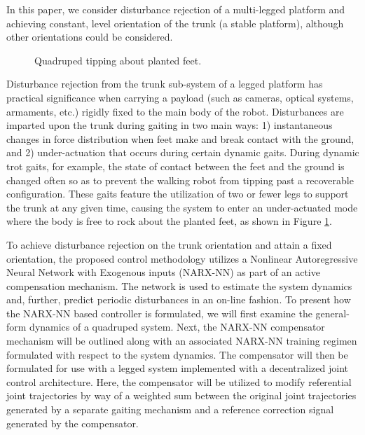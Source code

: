 In this paper, we consider disturbance rejection of a multi-legged platform and achieving constant, level orientation of the trunk (\IE a stable platform), although other orientations could be considered. 
	\begin{figure}[t!]
		\vspace{2mm}
		\centering
		\caption{ Quadruped tipping about planted feet.}
		\label{fig::quadruped_walking}
		\vspace{-7mm}
	\end{figure}
Disturbance rejection from the trunk sub-system of a legged platform has practical significance when carrying a payload (such as cameras, optical systems, armaments, etc.) rigidly fixed to the main body of the robot. Disturbances are imparted upon the trunk during gaiting in two main ways: 1) instantaneous changes in force distribution when feet make and break contact with the ground, and 2) under-actuation that occurs during certain dynamic gaits. During dynamic trot gaits, for example, the state of contact between the feet and the ground is changed often so as to prevent the walking robot from tipping past a recoverable configuration. These gaits feature the utilization of two or fewer legs to support the trunk at any given time, causing the system to enter an under-actuated mode where the body is free to rock about the planted feet, as shown in Figure \ref{fig::quadruped_walking}.

To achieve disturbance rejection on the trunk orientation and attain a fixed orientation, the proposed control methodology utilizes a Nonlinear Autoregressive Neural Network with Exogenous inputs (NARX-NN) as part of an active compensation mechanism. The network is used to estimate the system dynamics and, further, predict periodic disturbances in an on-line fashion. To present how the NARX-NN based controller is formulated, we will first examine the general-form dynamics of a quadruped system. Next, the NARX-NN compensator mechanism will be outlined along with an associated NARX-NN training regimen formulated with respect to the system dynamics. The compensator will then be formulated for use with a legged system implemented with a decentralized joint control architecture. Here, the compensator will be utilized to modify referential joint trajectories by way of a weighted sum between the original joint trajectories generated by a separate gaiting mechanism and a reference correction signal generated by the compensator.

